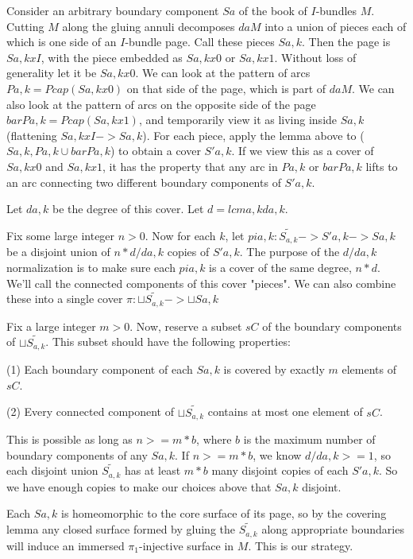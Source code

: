 \documentclass[12pt]{amsart}
\theoremstyle{definition}
\theoremstyle{remark}
\begin{document}
Consider an arbitrary boundary component $Sa$ of the book of $I$-bundles $M$.
Cutting $M$ along the gluing annuli decomposes $daM$ into a union of pieces
each of which is one side of an $I$-bundle page. Call these pieces $Sa,k$. Then
the page is $Sa,kxI$, with the piece embedded as $Sa,kx0$ or $Sa,kx1$. Without
loss of generality let it be $Sa,kx0$. We can look at the pattern of arcs $Pa,k
= P cap (Sa,kx0)$ on that side of the page, which is part of $daM$. We can also
look at the pattern of arcs on the opposite side of the page $barPa,k = P cap
(Sa,kx1)$, and temporarily view it as living inside $Sa,k$ (flattening $Sa,kxI
-> Sa,k$).  For each piece, apply the lemma above to ($Sa,k,Pa,k \cup barPa,k$)
to obtain a cover $S'a,k$. If we view this as a cover of $Sa,kx0$ and $Sa,kx1$,
it has the property that any arc in $Pa,k$ or $barPa,k$ lifts to an arc
connecting two different boundary components of $S'a,k$.

Let $da,k$ be the degree of this cover. Let $d = lcm a,k da,k$.

Fix some large integer $n>0$. Now for each $k$, let $pia,k : \widetilde{S_{a,k}} -> S'a,k
-> Sa,k$ be a disjoint union of $n*d/da,k$ copies of $S'a,k$. The purpose of
the $d/da,k$ normalization is to make sure each $pia,k$ is a cover of the same
degree, $n*d$.  We'll call the connected components of this cover "pieces". We
can also combine these into a single cover $\pi : \sqcup \widetilde{S_{a,k}} ->
\sqcup Sa,k$

Fix a large integer $m>0$. Now, reserve a subset $sC$ of the boundary
components of $\sqcup \widetilde{S_{a,k}}$.  This subset should have the following
properties:

(1) Each boundary component of each $Sa,k$ is covered by exactly $m$ elements
of $sC$.

(2) Every connected component of $\sqcup \widetilde{S_{a,k}}$ contains at most one element
of $sC$.

This is possible as long as $n >= m*b$, where $b$ is the maximum number of
boundary components of any $Sa,k$. If $n>= m*b$, we know $d/da,k >= 1$, so each
disjoint union $\widetilde{S_{a,k}}$ has at least $m*b$ many disjoint copies of each
$S'a,k$.  So we have enough copies to make our choices above that $Sa,k$
disjoint.

Each $Sa,k$ is homeomorphic to the core surface of its page, so by the covering
lemma any closed surface formed by gluing the $\widetilde{S_{a,k}}$ along appropriate
boundaries will induce an immersed $\pi_1$-injective surface in $M$. This is
our strategy.
\end{document}
